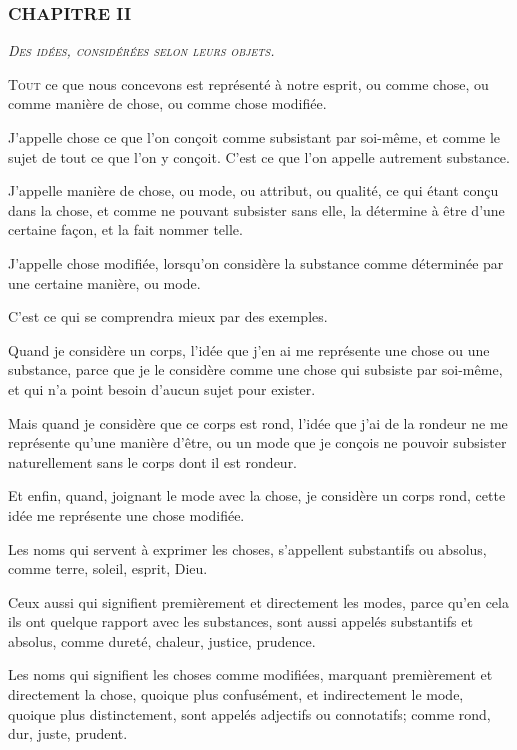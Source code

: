 \subsubsection{\centering \Large CHAPITRE II}

\begin{center}\emph{\large\scshape Des idées, considérées selon leurs objets.}\end{center}

	\lettrine{T}{out} ce que nous concevons est représenté à notre esprit, ou comme chose, ou comme manière de chose, ou comme chose modifiée.

J'appelle chose ce que l'on conçoit comme subsistant par soi-même, et comme le sujet de tout ce que l'on y conçoit. C'est ce que l'on appelle autrement substance.

J'appelle manière de chose, ou mode, ou attribut, ou qualité, ce qui étant conçu dans la chose, et comme ne pouvant subsister sans elle, la détermine à être d'une certaine façon, et la fait nommer telle.

J'appelle chose modifiée, lorsqu'on considère la substance comme déterminée par une certaine manière, ou mode.

C'est ce qui se comprendra mieux par des exemples.

Quand je considère un corps, l'idée que j'en ai me représente une chose ou une substance, parce que je le considère comme une chose qui subsiste par soi-même, et qui n'a point besoin d'aucun sujet pour exister.

Mais quand je considère que ce corps est rond, l'idée que j'ai de la rondeur ne me représente qu'une manière d'être, ou un mode que je conçois ne pouvoir subsister naturellement sans le corps dont il est rondeur.

Et enfin, quand, joignant le mode avec la chose, je considère un corps rond, cette idée me représente une chose modifiée.

Les noms qui servent à exprimer les choses, s'appellent substantifs ou absolus, comme terre, soleil, esprit, Dieu.

Ceux aussi qui signifient premièrement et directement les modes, parce qu'en cela ils ont quelque rapport avec les substances, sont aussi appelés substantifs et absolus, comme dureté, chaleur, justice, prudence.

Les noms qui signifient les choses comme modifiées, marquant premièrement et directement la chose, quoique plus confusément, et indirectement le mode, quoique plus distinctement, sont appelés adjectifs ou connotatifs; comme rond, dur, juste, prudent.

